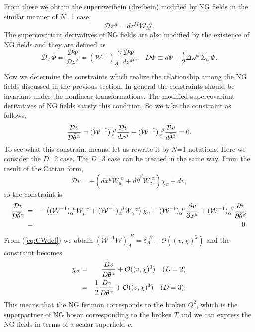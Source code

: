 \documentclass[a4paper,12pt]{article}
\def\btheta{\bar{\theta}}
\def\CD{\mathcal{D}}
\def\CW{\mathcal{W}}
\def\dfrac#1#2{{\displaystyle\frac{#1}{#2}}}
\def\cfrac#1#2{\dfrac{\mathstrut #1}{#2}}
\begin{document}
\relax From these we obtain the superzweibein (dreibein) modified by NG fields
in the similar manner of $N$=1 case,
\begin{equation}
 \CD z^{A} = dz^{M}\CW_{M}^{\>\>A}.
  \label{parzweidef}
\end{equation}
The supercovariant derivatives of NG fields are also modified by 
the existence of NG fields and they are defined as
\begin{equation}
 \CD_{A}\Phi = \frac{\CD\Phi}{\CD z^{A}} = (\CW^{-1})_{A}^{\>\>M}\frac{\CD\Phi}{dz^{M}},
 \quad
 D\Phi \equiv d\Phi + \frac{i}{2}\mathit{\Delta}\omega^{bc}\Sigma_{bc} 
 \Phi.
\end{equation}

Now we determine the constraints which realize the relationship among 
the NG fields discussed in the previous section. 
In general the constraints should be
invariant under the nonlinear transformations. The modified
supercovariant derivatives of NG fields 
satisfy this condition. So we take the constraint as follows,
\begin{equation}
 \cfrac{\CD v}{\CD \btheta^{\alpha}}
  = (\CW^{-1})_{\alpha}^{\>\>\mu}\cfrac{\CD v}{dx^{\mu}}
  + (\CW^{-1})_{\alpha}^{\>\>\beta}\cfrac{\CD v}{d\btheta^{\beta}}
  = 0.
  \label{parconstraint}
\end{equation}
To see what this constraint means, let us rewrite it by
$N$=1 notations. Here we consider the $D$=2 case.
The $D$=3 case can be treated in the same way. 
\relax From the result 
of the Cartan form,
\begin{equation}
 \CD v = -\left(dx^{\mu}W_{\mu}^{\>\>\alpha}
	   + d\btheta^{\beta}W_{\beta}^{\>\>\alpha}\right)\chi_{\alpha}
          + dv, \label{eq:CWdef}
\end{equation}
so the constraint is
\begin{eqnarray}
  \cfrac{\CD v}{\CD \btheta^{\alpha}}
  &=& -\left((\CW^{-1})_{\alpha}^{\>\>\mu}W_{\mu}^{\>\>\gamma}
	+ (\CW^{-1})_{\alpha}^{\>\>\beta}W_{\gamma}^{\>\>\gamma}
	\right)\chi_{\gamma}
   + (\CW^{-1})_{\alpha}^{\>\>\mu}\cfrac{\partial v}{\partial x^{\mu}}
   + (\CW^{-1})_{\alpha}^{\>\>\beta}\cfrac{\partial
  v}{\partial\btheta^{\beta}}
   \nonumber \\
  &=& 0. \label{parconstraint2}
\end{eqnarray}
\relax From (\ref{eq:CWdef}) we obtain
$(\CW^{-1} W)_{A}^{\>\>B} = \delta_{A}^{\>\>B} + \mathcal{O}((v,\chi)^{2})$ and 
the constraint becomes
\begin{eqnarray}
 \chi_{\alpha} &=&  \cfrac{Dv}{D\btheta^{\alpha}} + \mathcal{O}((v,\chi)^{3}) \quad (D=2)
	\nonumber \\
	&=& \frac{1}{2}\cfrac{Dv}{D\btheta^{\alpha}}
	 + \mathcal{O}((v,\chi)^{3}) \quad (D=3).
  \label{chieqv}
\end{eqnarray}
This means that the NG ferimon corresponds to the broken $Q^{2}$, which 
is the superpartner of NG boson corresponding to the broken $T$ and we can
express the NG fields in terms of a scalar superfield $v$.
\end{document}
